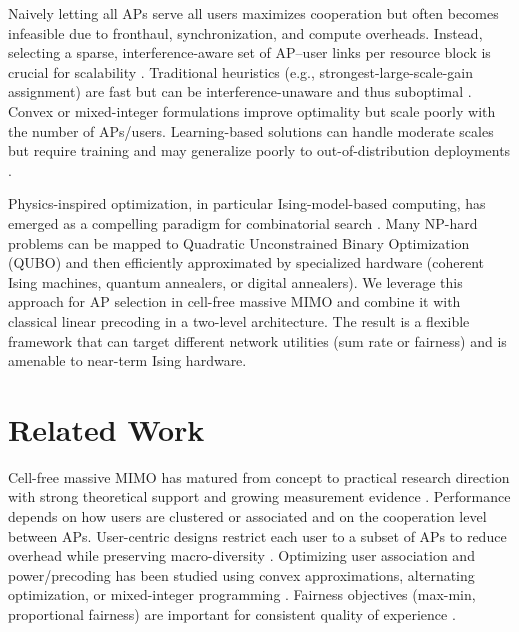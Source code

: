 {Naively letting all APs serve all users maximizes cooperation but often becomes infeasible due to fronthaul, synchronization, and compute overheads. Instead, selecting a sparse, interference-aware set of AP–user links per resource block is crucial for scalability \cite{interdonato2019scalability,chen2020structured}. Traditional heuristics (e.g., strongest-large-scale-gain assignment) are fast but can be interference-unaware and thus suboptimal \cite{zhang2019cell}. Convex or mixed-integer formulations improve optimality but scale poorly with the number of APs/users. Learning-based solutions can handle moderate scales but require training and may generalize poorly to out-of-distribution deployments \cite{elsherif2022resource,zappone2021uplink}.

Physics-inspired optimization, in particular Ising-model-based computing, has emerged as a compelling paradigm for combinatorial search \cite{lucas2014ising,mcmahon2016fully,inagaki2016coherent,kasi2021resource,grassl2022ising}. Many NP-hard problems can be mapped to Quadratic Unconstrained Binary Optimization (QUBO) and then efficiently approximated by specialized hardware (coherent Ising machines, quantum annealers, or digital annealers). We leverage this approach for AP selection in cell-free massive MIMO and combine it with classical linear precoding in a two-level architecture. The result is a flexible framework that can target different network utilities (sum rate or fairness) and is amenable to near-term Ising hardware.

\section{Related Work}


Cell-free massive MIMO has matured from concept to practical research direction with strong theoretical support and growing measurement evidence \cite{ngo2017cell,demir2021foundations,bjornson2019massive}. Performance depends on how users are clustered or associated and on the cooperation level between APs. User-centric designs restrict each user to a subset of APs to reduce overhead while preserving macro-diversity \cite{buzzi2019user,chen2020structured}. Optimizing user association and power/precoding has been studied using convex approximations, alternating optimization, or mixed-integer programming \cite{nayebi2017precoding,bjornson2019making}. Fairness objectives (max-min, proportional fairness) are important for consistent quality of experience \cite{bashar2021max}.

}
